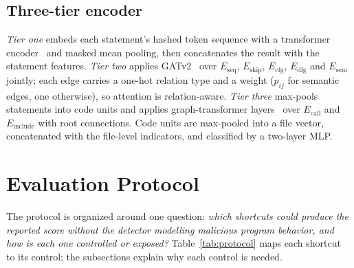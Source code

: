 \documentclass[pdflatex,sn-mathphys-num]{sn-jnl}
\begin{document}
\subsection{Three-tier encoder}\label{sec:encoder}
\emph{Tier one} embeds each statement's hashed token sequence with a
transformer encoder~\cite{vaswani2017attention} and masked mean pooling, then
concatenates the result with the statement features. \emph{Tier two} applies
GATv2~\cite{brody2022gatv2} over $E_{\text{seq}}$, $E_{\text{skip}}$,
$E_{\text{cfg}}$, $E_{\text{dfg}}$ and $E_{\text{sem}}$ jointly; each edge
carries a one-hot relation type and a weight ($p_{ij}$ for semantic edges, one
otherwise), so attention is relation-aware. \emph{Tier three} max-pools
statements into code units and applies graph-transformer
layers~\cite{shi2021unimp} over $E_{\text{call}}$ and $E_{\text{include}}$ with
root connections. Code units are max-pooled into a file vector, concatenated
with the file-level indicators, and classified by a two-layer MLP.

\section{Evaluation Protocol}\label{sec:protocol}
The protocol is organized around one question: \emph{which shortcuts could
produce the reported score without the detector modelling malicious program
behavior, and how is each one controlled or exposed?} Table~\ref{tab:protocol}
maps each shortcut to its control; the subsections explain why each control is
needed.
\end{document}
